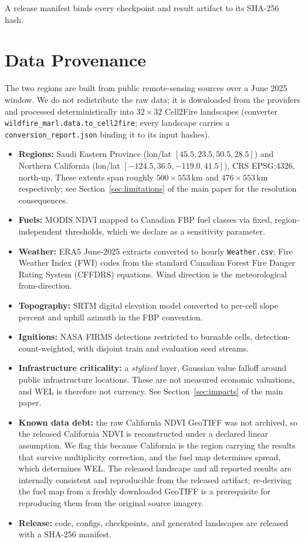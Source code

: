 \documentclass[letterpaper]{article}
\begin{document}
A release manifest binds every checkpoint and result artifact to its SHA-256 hash.

\section{Data Provenance}
\label{app:data}

The two regions are built from public remote-sensing sources over a June 2025 window. We do not redistribute the raw data; it is downloaded from the providers and processed deterministically into $32\times32$ Cell2Fire landscapes (converter \texttt{wildfire\_marl.data.to\_cell2fire}; every landscape carries a \texttt{conversion\_report.json} binding it to its input hashes).

\begin{itemize}\itemsep1pt
	\item \textbf{Regions:} Saudi Eastern Province (lon/lat $[45.5, 23.5, 50.5, 28.5]$) and Northern California (lon/lat $[-124.5, 36.5, -119.0, 41.5]$), CRS EPSG:4326, north-up. These extents span roughly $500 \times 553$\,km and $476 \times 553$\,km respectively; see Section~\ref{sec:limitations} of the main paper for the resolution consequences.
	\item \textbf{Fuels:} MODIS NDVI mapped to Canadian FBP fuel classes via fixed, region-independent thresholds, which we declare as a sensitivity parameter.
	\item \textbf{Weather:} ERA5 June-2025 extracts converted to hourly \texttt{Weather.csv}; Fire Weather Index (FWI) codes from the standard Canadian Forest Fire Danger Rating System (CFFDRS) equations. Wind direction is the meteorological from-direction.
	\item \textbf{Topography:} SRTM digital elevation model converted to per-cell slope percent and uphill azimuth in the FBP convention.
	\item \textbf{Ignitions:} NASA FIRMS detections restricted to burnable cells, detection-count-weighted, with disjoint train and evaluation seed streams.
	\item \textbf{Infrastructure criticality:} a \emph{stylized} layer, Gaussian value falloff around public infrastructure locations. These are not measured economic valuations, and WEL is therefore not currency. See Section~\ref{sec:impacts} of the main paper.
	\item \textbf{Known data debt:} the raw California NDVI GeoTIFF was not archived, so the released California NDVI is reconstructed under a declared linear assumption. We flag this because California is the region carrying the results that survive multiplicity correction, and the fuel map determines spread, which determines WEL. The released landscape and all reported results are internally consistent and reproducible from the released artifact; re-deriving the fuel map from a freshly downloaded GeoTIFF is a prerequisite for reproducing them from the original source imagery.
	\item \textbf{Release:} code, configs, checkpoints, and generated landscapes are released with a SHA-256 manifest.
\end{itemize}
\end{document}
